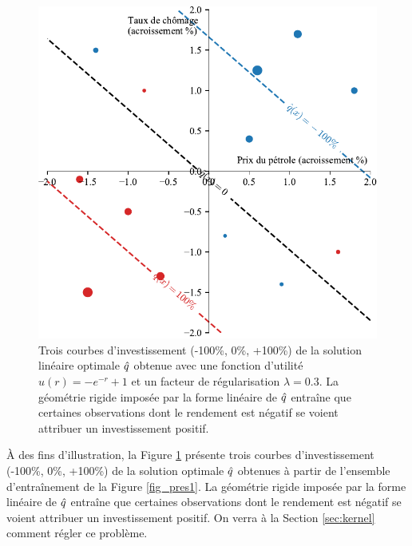 \begin{figure}[p]
  \centering
  \includegraphics[width=\textwidth]{../experiments/fig/pres/pres3_fr.pdf}
  \caption[Décision linéaire]{Trois courbes d'investissement (-100\%, 0\%,
    +100\%) de la solution linéaire optimale $\hat q$ obtenue avec une fonction d'utilité
    $u(r) = -e^{-r}+1$ et un facteur de régularisation $\lambda = 0.3$. La géométrie rigide
    imposée par la forme linéaire de $\hat q$ entraîne que certaines observations dont le
    rendement est négatif se voient attribuer un investissement positif.}
  \label{fig_pres3}
\end{figure}

À des fins d'illustration, la Figure \ref{fig_pres3} présente trois courbes
d'investissement (-100\%, 0\%, +100\%) de la solution optimale $\hat q$ obtenues à partir de
l'ensemble d'entraînement de la Figure \ref{fig_pres1}. La géométrie rigide imposée par la
forme linéaire de $\hat q$ entraîne que certaines observations dont le rendement est négatif
se voient attribuer un investissement positif. On verra à la Section \ref{sec:kernel}
comment régler ce problème. 


